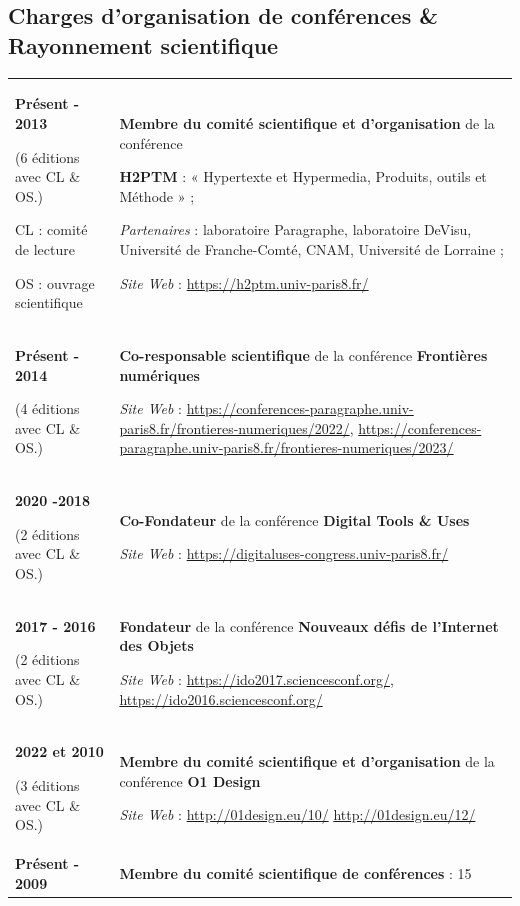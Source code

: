 \documentclass[
  a4paper,
  DIV=11,
  numbers=noendperiod]{scrreprt}
\begin{document}
\subsection{Charges d'organisation de conférences \& Rayonnement
scientifique}\label{charges-dorganisation-de-confuxe9rences-rayonnement-scientifique}

\begin{longtable}[]{@{}
  >{\raggedright\arraybackslash}p{}
  >{\raggedright\arraybackslash}p{}@{}}
\toprule\noalign{}
\endhead
\bottomrule\noalign{}
\endlastfoot
\textbf{Présent - 2013}

(6 éditions avec CL \& OS.)

CL : comité de lecture

OS : ouvrage scientifique & \textbf{Membre du comité scientifique et
d'organisation} de la conférence

\textbf{H2PTM} : « Hypertexte et Hypermedia, Produits, outils et Méthode
» ;

\emph{Partenaires} : laboratoire Paragraphe, laboratoire DeVisu,
Université de Franche-Comté, CNAM, Université de Lorraine ;

\emph{Site Web} : \url{https://h2ptm.univ-paris8.fr/} \\
\textbf{Présent - 2014}

(4 éditions avec CL \& OS.) & \textbf{Co-responsable scientifique} de la
conférence \textbf{Frontières numériques}

\emph{Site Web} :
\url{https://conferences-paragraphe.univ-paris8.fr/frontieres-numeriques/2022/},
\url{https://conferences-paragraphe.univ-paris8.fr/frontieres-numeriques/2023/} \\
\textbf{2020 -2018}

(2 éditions avec CL \& OS.) & \textbf{Co-Fondateur} de la conférence
\textbf{Digital Tools \& Uses}

\emph{Site Web} : \url{https://digitaluses-congress.univ-paris8.fr/} \\
\textbf{2017 - 2016}

(2 éditions avec CL \& OS.) & \textbf{Fondateur} de la conférence
\textbf{Nouveaux défis de l'Internet des Objets}

\emph{Site Web} : \url{https://ido2017.sciencesconf.org/},
\url{https://ido2016.sciencesconf.org/} \\
\textbf{2022 et 2010}

(3 éditions avec CL \& OS.) & \textbf{Membre du comité scientifique et
d'organisation} de la conférence \textbf{O1 Design}

\emph{Site Web} : \url{http://01design.eu/10/}
\url{http://01design.eu/12/} \\
\textbf{Présent - 2009} & \textbf{Membre du comité scientifique de
conférences} : 15 \\
\end{longtable}
\end{document}
